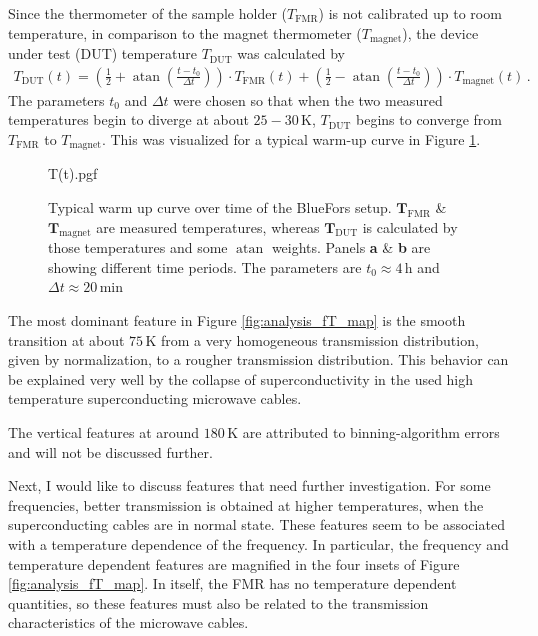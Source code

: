 Since the thermometer of the sample holder ($T_\text{FMR}$) is not calibrated up to room temperature, in comparison to the magnet thermometer ($T_\text{magnet}$), the device under test (DUT) temperature $T_\text{DUT}$ was calculated by
\begin{align}
    T_\text{DUT}(t)=\left(\frac{1}{2}+\operatorname{atan}\left(\frac{t-t_0}{\Delta t}\right)\right)\cdot T_\text{FMR}(t)+\left(\frac{1}{2}-\operatorname{atan}\left(\frac{t-t_0}{\Delta t}\right)\right)\cdot T_\text{magnet}(t)\,.
\end{align}
The parameters $t_0$ and $\Delta t$ were chosen so that when the two measured temperatures begin to diverge at about $25-30\,$K, $T_\text{DUT}$ begins to converge from $T_\text{FMR}$ to $T_\text{magnet}$. This was visualized for a typical warm-up curve in Figure \ref{fig:analysis_fT_map_Tt}.
\begin{figure}
    \centering
    {T(t).pgf}
    \caption[Typical warm-up curve for the BlueFors setup]{Typical warm up curve over time of the BlueFors setup. \textbf{\color{seeblau100}$\boldsymbol{T}_\text{FMR}$} \& \textbf{\color[rgb]{0.571821,0.803166,0.878400}$\boldsymbol{T}_\text{magnet}$} are measured temperatures, whereas \textbf{\color{antiseeblau100}$\boldsymbol{T}_\text{DUT}$} is calculated by those temperatures and some $\operatorname{atan}$ weights. Panels \textbf{\color{antiseeblau100}a} \& \textbf{\color{antiseeblau100}b} are showing different time periods. The parameters are $t_0\approx4\,$h and $\Delta t\approx20\,$min} 
    \label{fig:analysis_fT_map_Tt}
\end{figure}

The most dominant feature in Figure \ref{fig:analysis_fT_map} is the smooth transition at about $75\,$K from a very homogeneous transmission distribution, given by normalization, to a rougher transmission distribution. This behavior can be explained very well by the collapse of superconductivity in the used high temperature superconducting microwave cables.

The vertical features at around $180\,$K are attributed to binning-algorithm errors and will not be discussed further.


Next, I would like to discuss features that need further investigation. For some frequencies, better transmission is obtained at higher temperatures, when the superconducting cables are in normal state. These features seem to be associated with a temperature dependence of the frequency. In particular, the frequency and temperature dependent features are magnified in the four insets of Figure \ref{fig:analysis_fT_map}. In itself, the FMR has no temperature dependent quantities, so these features must also be related to the transmission characteristics of the microwave cables.

